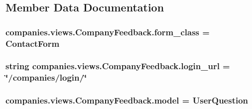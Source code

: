 \subsection{Member Data Documentation}
\hypertarget{classcompanies_1_1views_1_1_company_feedback_afc3355f434a406261c348dccc8a7848a}{
\subsubsection[{form\-\_\-class}]{\setlength{\rightskip}{0pt plus 5cm}companies.\-views.\-Company\-Feedback.\-form\-\_\-class = {\bf Contact\-Form}\hspace{0.3cm}{\ttfamily [static]}}}\label{classcompanies_1_1views_1_1_company_feedback_afc3355f434a406261c348dccc8a7848a}
\hypertarget{classcompanies_1_1views_1_1_company_feedback_aa901529da10997e8b0fe618ffb2ca42c}{
\subsubsection[{login\-\_\-url}]{\setlength{\rightskip}{0pt plus 5cm}string companies.\-views.\-Company\-Feedback.\-login\-\_\-url = \char`\"{}/companies/login/\char`\"{}\hspace{0.3cm}{\ttfamily [static]}}}\label{classcompanies_1_1views_1_1_company_feedback_aa901529da10997e8b0fe618ffb2ca42c}
\hypertarget{classcompanies_1_1views_1_1_company_feedback_a04f3ad8c8e16ae670cccd28be6f5f532}{
\subsubsection[{model}]{\setlength{\rightskip}{0pt plus 5cm}companies.\-views.\-Company\-Feedback.\-model = {\bf User\-Question}\hspace{0.3cm}{\ttfamily [static]}}}\label{classcompanies_1_1views_1_1_company_feedback_a04f3ad8c8e16ae670cccd28be6f5f532}
